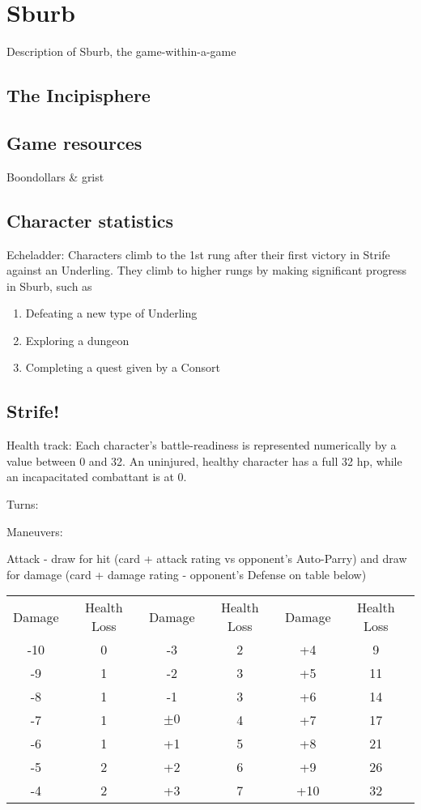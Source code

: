 \chapter{Sburb}

Description of Sburb, the game-within-a-game

\section{The Incipisphere}

\section{Game resources}
Boondollars \& grist

\section{Character statistics}

Echeladder: Characters climb to the 1st rung after their first victory in Strife against an Underling.
They climb to higher rungs by making significant progress in Sburb, such as
\begin{enumerate}
	\item Defeating a new type of Underling
	\item Exploring a dungeon
	\item Completing a quest given by a Consort
\end{enumerate}

\section{Strife!}

Health track: Each character's battle-readiness is represented numerically by a value between 0 and 32.
An uninjured, healthy character has a full 32 hp, while an incapacitated combattant is at 0.

Turns:

Maneuvers:

Attack - draw for hit (card + attack rating vs opponent's Auto-Parry) and draw for damage (card + damage rating - opponent's Defense on table below)

\begin{tabular}{cc|cc|cc}
	Damage & Health Loss & Damage & Health Loss & Damage & Health Loss \\
	-10 & 0 & -3 & 2 & +4 & 9 \\
	-9 & 1 & -2 & 3 & +5 & 11 \\
	-8 & 1 & -1 & 3 & +6 & 14 \\
	-7 & 1 & $\pm0$ & 4 & +7 & 17 \\
	-6 & 1 & +1 & 5 & +8 & 21 \\
	-5 & 2 & +2 & 6 & +9 & 26 \\
	-4 & 2 & +3 & 7 & +10 & 32
\end{tabular}
